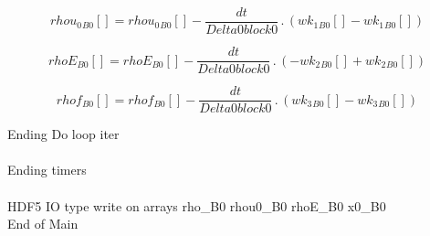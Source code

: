\documentclass{article}
\begin{document}
\begin{dmath}{rhou_{0}{_{B0}}}[{}] = {rhou_{0}{_{B0}}}[{}] - \frac{dt}{Delta0block0} \,.\, \left({wk_{1}{_{B0}}}[{}] - {wk_{1}{_{B0}}}[{}]\right)\end{dmath}

\begin{dmath}{rhoE{_{B0}}}[{}] = {rhoE{_{B0}}}[{}] - \frac{dt}{Delta0block0} \,.\, \left(- {wk_{2}{_{B0}}}[{}] + {wk_{2}{_{B0}}}[{}]\right)\end{dmath}

\begin{dmath}{rhof{_{B0}}}[{}] = {rhof{_{B0}}}[{}] - \frac{dt}{Delta0block0} \,.\, \left({wk_{3}{_{B0}}}[{}] - {wk_{3}{_{B0}}}[{}]\right)\end{dmath}

\noindent Ending Do loop iter\\
\\\noindent Ending timers\\
\\\noindent HDF5 IO type write on arrays rho_B0 rhou0_B0 rhoE_B0 x0_B0\\\noindent End of Main\\
\end{document}
